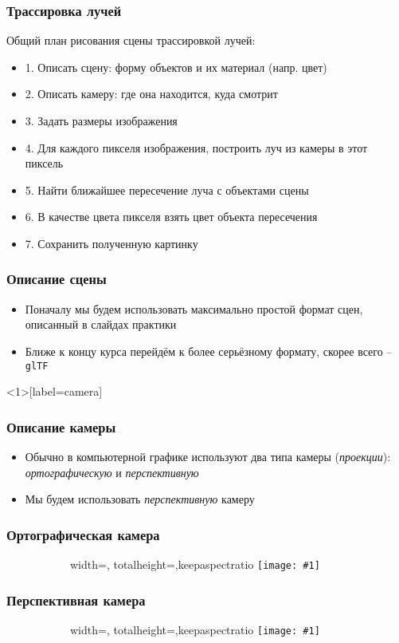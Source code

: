 \documentclass[10pt,handout]{beamer}
\newcommand{\slideimage}[1]{
  \begin{figure}
    \begin{adjustbox}{width=\textwidth, totalheight=\textheight-2\baselineskip-2\baselineskip,keepaspectratio}
      \texttt{[image: \#1]}
    \end{adjustbox}
  \end{figure}
}
\begin{document}
\begin{frame}
\frametitle{Трассировка лучей}
Общий план рисования сцены трассировкой лучей:
\pause
\begin{itemize}
\item 1. Описать сцену: форму объектов и их материал (напр. цвет)
\pause
\item 2. Описать камеру: где она находится, куда смотрит
\pause
\item 3. Задать размеры изображения
\pause
\item 4. Для каждого пикселя изображения, построить луч из камеры в этот пиксель
\pause
\item 5. Найти ближайшее пересечение луча с объектами сцены
\pause
\item 6. В качестве цвета пикселя взять цвет объекта пересечения
\pause
\item 7. Сохранить полученную картинку
\end{itemize}
\end{frame}

\begin{frame}
\frametitle{Описание сцены}
\begin{itemize}
\item Поначалу мы будем использовать максимально простой формат сцен, описанный в слайдах практики
\pause
\item Ближе к концу курса перейдём к более серьёзному формату, скорее всего -- \texttt{glTF}
\end{itemize}
\end{frame}

\begin{frame}<1>[label=camera]
\frametitle{Описание камеры}
\begin{itemize}
\item Обычно в компьютерной графике используют два типа камеры (\textit{проекции}): \textit{ортографическую} и \textit{перспективную}
\pause
\item Мы будем использовать \textit{перспективную} камеру
\end{itemize}
\end{frame}

\begin{frame}
\frametitle{Ортографическая камера}
\begin{figure}
\slideimage{orthographic.png}
\end{figure}
\end{frame}

\begin{frame}
\frametitle{Перспективная камера}
\begin{figure}
\slideimage{perspective.png}
\end{figure}
\end{frame}
\end{document}
